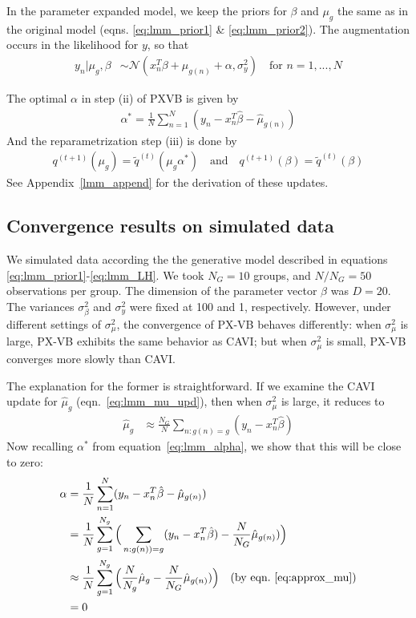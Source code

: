 \documentclass{article}
\begin{document}
In the parameter expanded model, we keep the priors for $\beta$ and $\mu_g$ the same as in the original model (eqns. \ref{eq:lmm_prior1} \& \ref{eq:lmm_prior2}). The augmentation occurs in the likelihood for $y$, so that
\begin{align}
y_n | \mu_g, \beta &\sim \mathcal N (x_n^T\beta + \mu_{g(n)}+\alpha, \sigma^2_y)\quad \text{for $n = 1, ..., N$} 
\end{align}

The optimal $\alpha$ in step (ii) of PXVB is given by 
\begin{align}
\alpha^* =  \frac{1}{N}\sum_{n=1}^N (y_n - x_n^T\hat\beta - \hat\mu_{g(n)}) \label{eq:lmm_alpha}
\end{align}
And the reparametrization step (iii) is done by 
\begin{align}
    q^{(t+1)}(\mu_g) = \tilde q^{(t)}(\mu_g\alpha^*) \quad \text{and} \quad q^{(t+1)}(\beta) = \tilde q^{(t)}(\beta)
\end{align}
See Appendix~\ref{lmm_append} for the derivation of these updates. 



\subsection{Convergence results on simulated data}
We simulated data according the the generative model described in equations \ref{eq:lmm_prior1}-\ref{eq:lmm_LH}. We took $N_G = 10$ groups, and $N/N_G = 50$ observations per group. The dimension of the parameter vector $\beta$ was $D = 20$. The variances $\sigma^2_\beta$ and $\sigma^2_y$ were fixed at 100 and 1, respectively. However, under different settings of $\sigma^2_\mu$, the convergence of PX-VB behaves differently: when $\sigma^2_\mu$ is large, PX-VB exhibits the same behavior as CAVI; but when $\sigma^2_\mu$ is small, PX-VB converges more slowly than CAVI. 

The explanation for the former is straightforward. If we examine the CAVI update for $\hat\mu_g$ (eqn.~\ref{eq:lmm_mu_upd}), then when $\sigma^2_\mu$ is large, it reduces to 
\begin{align}
{\hat\mu_g} &\approx \frac{N_G}{N}\sum_{n: g(n) = g} (y_n - x_n^T\hat\beta) \label{eq:approx_mu}
\end{align}
Now recalling $\alpha^*$ from equation~\ref{eq:lmm_alpha}, we show that this will be close to zero: 
\begin{align}
\alpha &= \frac{1}{N} \sum_{n=1}^N (y_n - x_n^T \hat\beta - \hat\mu_{g(n)})\\
    &= \frac{1}{N} \sum_{g=1}^{N_g} \Big(\sum_{n: g(n)) = g} (y_n - x_n^T \hat\beta)- \frac{N}{N_G}\hat\mu_{g(n)})\Big) \\
    &\approx \frac{1}{N} \sum_{g=1}^{N_g} \Big(\frac{N}{N_g}\hat\mu_g - \frac{N}{N_G}\hat\mu_{g(n)})\Big) \quad \text{(by eqn.~\ref{eq:approx_mu})}\\
    &= 0
\end{align}
\end{document}
